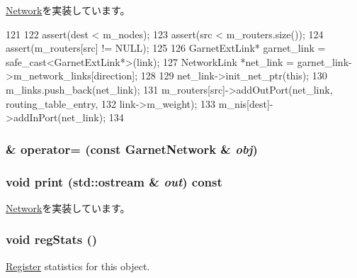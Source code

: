 \hyperlink{classNetwork_a4e62c2a0e4a511dae2e9870a3d305719}{Network}を実装しています。


\begin{DoxyCode}
121 {
122     assert(dest < m_nodes);
123     assert(src < m_routers.size());
124     assert(m_routers[src] != NULL);
125 
126     GarnetExtLink* garnet_link = safe_cast<GarnetExtLink*>(link);
127     NetworkLink *net_link = garnet_link->m_network_links[direction];
128 
129     net_link->init_net_ptr(this);
130     m_links.push_back(net_link);
131     m_routers[src]->addOutPort(net_link, routing_table_entry,
132                                          link->m_weight);
133     m_nis[dest]->addInPort(net_link);
134 }
\end{DoxyCode}
\hypertarget{classGarnetNetwork_aa695f7973be23b993579769c443d1962}{
\subsubsection[{operator=}]{\& operator= (const {\bf GarnetNetwork} \& {\em obj})}}
\label{classGarnetNetwork_aa695f7973be23b993579769c443d1962}
\hypertarget{classGarnetNetwork_ac55fe386a101fbae38c716067c9966a0}{
\subsubsection[{print}]{\setlength{\rightskip}{0pt plus 5cm}void print (std::ostream \& {\em out}) const}}
\label{classGarnetNetwork_ac55fe386a101fbae38c716067c9966a0}


\hyperlink{classNetwork_a3ea5f7af5db62cc24f4e40df9ea5c971}{Network}を実装しています。\hypertarget{classGarnetNetwork_a4dc637449366fcdfc4e764cdf12d9b11}{
\subsubsection[{regStats}]{\setlength{\rightskip}{0pt plus 5cm}void regStats ()}}
\label{classGarnetNetwork_a4dc637449366fcdfc4e764cdf12d9b11}
\hyperlink{classRegister}{Register} statistics for this object. 

